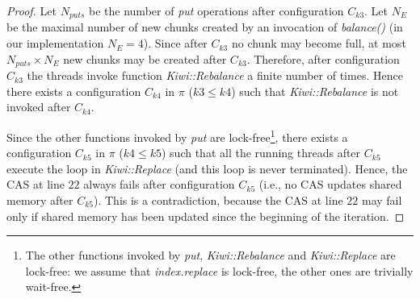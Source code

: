 \begin{proof}
{Let $N_{puts}$ be the number of \emph{put} operations after configuration $C_{k3}$.
Let $N_E$ be the maximal number of new chunks created by an invocation of \emph{balance()} (in our implementation $N_E=4$).
Since after $C_{k3}$ no chunk may become full, at most $N_{puts} \times N_E$ new chunks may be created after $C_{k3}$.
Therefore, after configuration $C_{k3}$ the threads invoke function  \emph{Kiwi::Rebalance} a finite number of times.
Hence there exists a configuration $C_{k4}$ in $\pi$ ($k3 \leq k4$) such that \emph{Kiwi::Rebalance} is not invoked after $C_{k4}$.





Since the other functions invoked by \emph{put} are lock-free\footnote{
The other functions invoked by \emph{put}, \emph{Kiwi::Rebalance} and \emph{Kiwi::Replace} are lock-free:
we assume that \emph{index.replace} is lock-free, the other ones are trivially wait-free.},
there exists a configuration $C_{k5}$ in $\pi$ ($k4 \leq k5$) such that all the running threads
after $C_{k5}$ execute the loop in \emph{Kiwi::Replace} (and this loop is never terminated).
%
Hence, the CAS at line $22$ always fails after configuration $C_{k5}$ (i.e., no CAS updates shared memory after $C_{k5}$).
This is a contradiction, because the  CAS at line $22$ may fail only if shared memory has been updated since the beginning of the iteration.



%
%
%
}
\end{proof}
